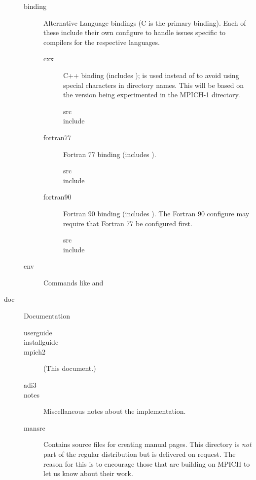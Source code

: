 \documentclass{article}
\begin{document}
\begin{description}
\begin{description}
  \item[binding]Alternative Language bindings (C is the primary
  binding).
        Each of these include their own configure to handle issues
  specific to compilers for the   respective languages.
    \begin{description}
    \item[cxx]C++ binding (includes );  is
    used instead of  to avoid using special characters in
    directory names.  This will be based on the version being
  experimented in the MPICH-1  directory.
      \begin{description}
      \item[src]
      \item[include]
      \end{description}
    \item[fortran77]Fortran 77 binding (includes ).
      \begin{description}
      \item[src]
      \item[include]
      \end{description}
    \item[fortran90]Fortran 90 binding (includes ).
        The Fortran 90 configure may require that Fortran 77 be
  configured first.
      \begin{description}
      \item[src]
      \item[include]
      \end{description}
    \end{description}
  \item[env]Commands like  and 
  \end{description}
  

\item[doc]Documentation
  \begin{description}
    \item[userguide]
    \item[installguide]
    \item[mpich2] (This document.)
    \item[adi3]
    \item[notes]Miscellaneous notes about the implementation.
    \item[mansrc] Contains source files for creating manual pages.  This 
    directory is \emph{not} part of the regular distribution but is delivered 
    on request.  The reason for this is to encourage those that are
    building on MPICH to let us know about their work.
   

\end{description}
\end{description}
\end{document}
